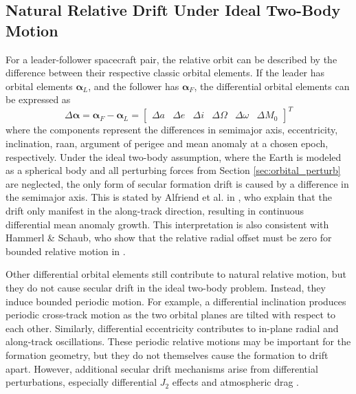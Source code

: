 \subsection{Natural Relative Drift Under Ideal Two-Body Motion}
\label{sec:natural_rel_drift}

For a leader-follower spacecraft pair, the relative orbit can be described by the difference between their respective classic orbital elements. If the leader has orbital elements $\boldsymbol{\alpha}_L$, and the follower has $\boldsymbol{\alpha}_F$, the differential orbital elements can be expressed as
\begin{equation}
    \Delta \boldsymbol{\alpha} = \boldsymbol{\alpha}_F - \boldsymbol{\alpha}_L = \begin{bmatrix}
        \Delta a & \Delta e & \Delta i & \Delta \Omega & \Delta \omega & \Delta M_0
    \end{bmatrix}^T
\end{equation}
where the components represent the differences in semimajor axis, eccentricity, inclination, \gls{raan}, argument of perigee and mean anomaly at a chosen epoch, respectively. Under the ideal two-body assumption, where the Earth is modeled as a spherical body and all perturbing forces from Section \ref{sec:orbital_perturb} are neglected, the only form of secular formation drift is caused by a difference in the semimajor axis. This is stated by Alfriend et al. in \cite{alfriend2010}, who explain that the drift only manifest in the along-track direction, resulting in continuous differential mean anomaly growth. This interpretation is also consistent with Hammerl \& Schaub, who show that the relative radial offset must be zero for bounded relative motion in \cite{schaub2026}.

Other differential orbital elements still contribute to natural relative motion, but they do not cause secular drift in the ideal two-body problem. Instead, they induce bounded periodic motion. For example, a differential inclination produces periodic cross-track motion as the two orbital planes are tilted with respect to each other. Similarly, differential eccentricity contributes to in-plane radial and along-track oscillations. These periodic relative motions may be important for the formation geometry, but they do not themselves cause the formation to drift apart. However, additional secular drift mechanisms arise from differential perturbations, especially differential $J_2$ effects and atmospheric drag \cite{damico2006proximity}.



